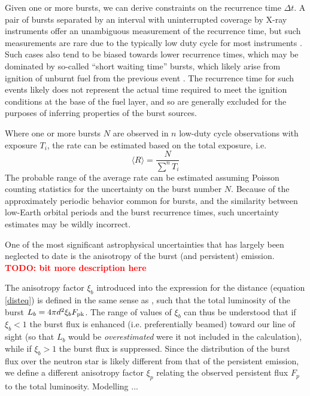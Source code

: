 \documentclass{aastex63}
\newcommand{\todo}[1]{\textbf{\textcolor{red}{TODO: #1}}} %
\begin{document}
Given one or more bursts, we can derive constraints on the recurrence time $\Delta t$. A pair of bursts separated by an interval with uninterrupted coverage by X-ray instruments offer an unambiguous measurement of the recurrence time, but such measurements are rare due to the typically low duty cycle for most instruments \cite[e.g.][]{minbar}.
%
Such cases also tend to be biased towards lower recurrence times, which may be dominated by so-called ``short waiting time'' bursts, which likely arise from ignition of unburnt fuel from the previous event \cite[]{keek10}. The recurrence time for such events likely does not represent the actual time required to meet the ignition conditions at the base of the fuel layer, and so are generally excluded for the purposes of inferring properties of the burst sources.

Where one or more bursts $N$ are observed in $n$ low-duty cycle observations with exposure $T_i$, the rate can be estimated based on the total exposure, i.e.
\begin{equation}
\langle R\rangle = \frac{N}{\sum^n T_i}
\end{equation}
The probable range of the average rate can be estimated assuming Poisson counting statistics for the uncertainty on the burst number $N$. Because of the approximately periodic behavior common for bursts, and the similarity between low-Earth orbital periods and the burst recurrence times, such uncertainty estimates may be wildly incorrect.

One of the most significant astrophysical uncertainties that has largely been neglected to date is the anisotropy of the burst (and persistent) emission.
\todo{ bit more description here }

The anisotropy factor $\xi_b$ introduced into the expression for the distance (equation  \ref{disteq}) is defined in the same sense as \citep{fuji88}, such that the total luminosity of the burst $L_b=4\pi d^2\xi_b F_{\rm pk}$. The range of values of $\xi_b$ can thus be understood that if $\xi_b<1$ the burst flux is enhanced (i.e. preferentially beamed) toward our line of sight (so that $L_b$ would be {\it overestimated} were it not included in the calculation), while if $\xi_b>1$ the burst flux is suppressed.
%
Since the distribution of the burst flux over the neutron star is likely different from that of the persistent emission, we define a different anisotropy factor $\xi_p$ relating the observed persistent flux $F_p$ to the total luminosity. Modelling \cite[]{he16}...
\end{document}
